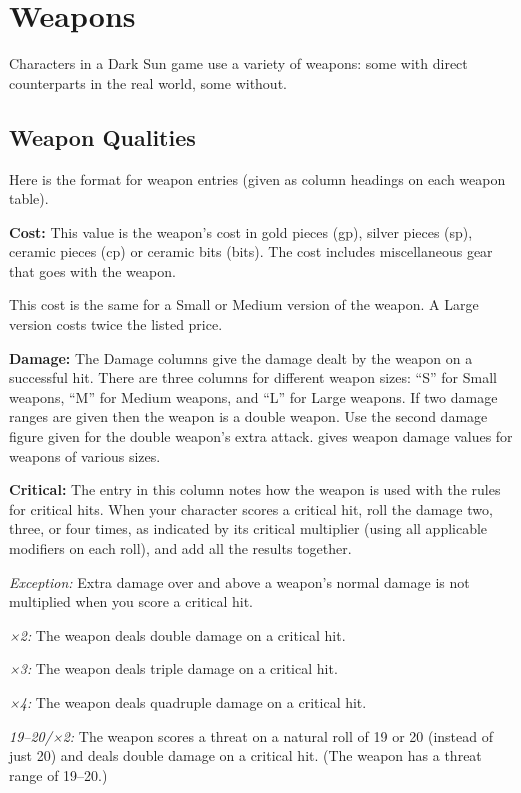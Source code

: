 \section{Weapons}
Characters in a Dark Sun game use a variety of weapons: some with direct counterparts in the real world, some without.




\subsection{Weapon Qualities}
Here is the format for weapon entries (given as column headings on each weapon table).

\textbf{Cost:} This value is the weapon's cost in gold pieces (gp), silver pieces (sp), ceramic pieces (cp) or ceramic bits (bits). The cost includes miscellaneous gear that goes with the weapon.

This cost is the same for a Small or Medium version of the weapon. A Large version costs twice the listed price.

\textbf{Damage:} The Damage columns give the damage dealt by the weapon on a successful hit. There are three columns for different weapon sizes: ``S'' for Small weapons, ``M'' for Medium weapons, and ``L'' for Large weapons. If two damage ranges are given then the weapon is a double weapon. Use the second damage figure given for the double weapon's extra attack.  gives weapon damage values for weapons of various sizes.

\textbf{Critical:} The entry in this column notes how the weapon is used with the rules for critical hits. When your character scores a critical hit, roll the damage two, three, or four times, as indicated by its critical multiplier (using all applicable modifiers on each roll), and add all the results together.

\textit{Exception:} Extra damage over and above a weapon's normal damage is not multiplied when you score a critical hit.

\textit{×2:} The weapon deals double damage on a critical hit.

\textit{×3:} The weapon deals triple damage on a critical hit.

\textit{×4:} The weapon deals quadruple damage on a critical hit.

\textit{19--20/×2:} The weapon scores a threat on a natural roll of 19 or 20 (instead of just 20) and deals double damage on a critical hit. (The weapon has a threat range of 19--20.)

